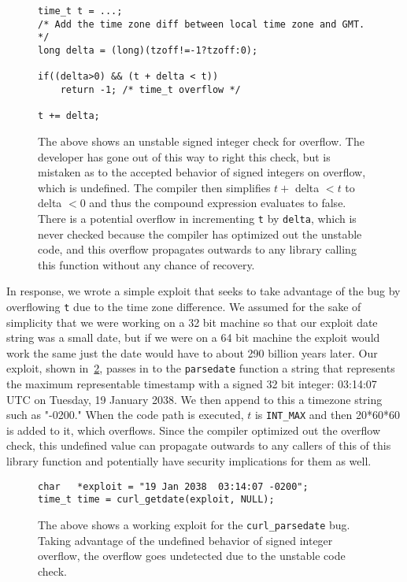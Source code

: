 \documentclass[9pt,twocolumn]{article}
\begin{document}
\begin{figure}[h]
\begin{lstlisting}
time_t t = ...;
/* Add the time zone diff between local time zone and GMT. */
long delta = (long)(tzoff!=-1?tzoff:0);
 
if((delta>0) && (t + delta < t))
    return -1; /* time_t overflow */
 
t += delta;
\end{lstlisting}
\label{fig:libcurl1}
\caption{The above shows an unstable signed integer check for overflow. The developer has gone out of this way to right this check, but is mistaken as to the accepted behavior of signed integers on overflow, which is undefined. The compiler then simplifies $ t  + $ delta $ < t$ to delta $ < 0$ and thus the compound expression evaluates to false. There is a potential overflow in incrementing \texttt{t} by \texttt{delta}, which is never checked because the compiler has optimized out the unstable code, and this overflow propagates outwards to any library calling this function without any chance of recovery.}
\end{figure}


In response, we wrote a simple exploit that seeks to take advantage of the bug by overflowing \texttt{t} due to the time zone difference. We assumed for the sake of simplicity that we were working on a 32 bit machine so that our exploit date string was a small date, but if we were on a 64 bit machine the exploit would work the same just the date would have to about 290 billion years later. Our exploit, shown in~\ref{fig:curl-xploit}, passes in to the \texttt{parsedate} function a string that represents the maximum representable timestamp with a signed 32 bit integer: 03:14:07 UTC on Tuesday, 19 January 2038. We then append to this a timezone string such as "-0200." When the code path is executed, $t$ is \texttt{INT\_MAX} and then 20*60*60 is added to it, which overflows. Since the compiler optimized out the overflow check, this undefined value can propagate outwards to any callers of this of this library function and potentially have security implications for them as well.

\begin{figure}[h]
\begin{lstlisting}
char   *exploit = "19 Jan 2038  03:14:07 -0200";
time_t time = curl_getdate(exploit, NULL);
\end{lstlisting}
\label{fig:curl-xploit}
\caption{The above shows a working exploit for the \texttt{curl\_parsedate} bug. Taking advantage of the undefined behavior of signed integer overflow, the overflow goes undetected due to the unstable code check. }
\end{figure}
\end{document}
